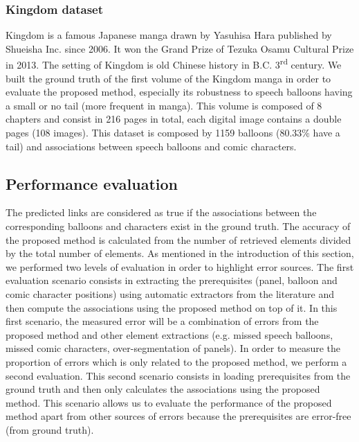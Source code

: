 \documentclass[conference]{IEEEtran}
\newcommand{\modif}[1]{{\bf\color{red}#1}}
\begin{document}
\subsubsection{Kingdom dataset} %
\label{ssub:kingdom_dataset}
Kingdom is a famous Japanese manga drawn by Yasuhisa Hara published by Shueisha Inc. since 2006.
It won the Grand Prize of Tezuka Osamu Cultural Prize in 2013.
The setting of Kingdom is old Chinese history in B.C. 3\textsuperscript{rd} century.
We built the ground truth of the first volume of the Kingdom manga in order to evaluate the proposed method, especially its robustness to speech balloons having a small or no tail (more frequent in manga).
This volume is composed of 8 chapters and consist in 216 pages in total, each digital image contains a double pages (108 images).
This dataset is composed by 1159 balloons (80.33\% have a tail) and associations between speech balloons and comic characters.




\subsection{Performance evaluation}
\label{sec:eval}
The predicted links are considered as true if the associations between the corresponding balloons and characters exist in the ground truth.
The accuracy of the proposed method is calculated from the number of retrieved elements divided by the total number of elements.
As mentioned in the introduction of this section, we performed two levels of evaluation in order to highlight error sources.
The first evaluation scenario consists in extracting the prerequisites (panel, balloon and comic character positions) using automatic extractors from the literature and then compute the associations using the proposed method on top of it.
In this first scenario, the measured error will be a combination of errors from the proposed method and other element extractions (e.g. missed speech balloons, missed comic characters, over-segmentation of panels).
In order to measure the proportion of errors which is only related to the proposed method, we perform a second evaluation.
This second scenario consists in loading prerequisites from the ground truth and then only calculates the associations using the proposed method.
This scenario allows us to evaluate the performance of the proposed method apart from other sources of errors because the prerequisites are error-free (from ground truth).
\end{document}

